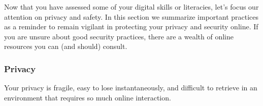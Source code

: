 \documentclass[
  letterpaper,
  DIV=11,
  numbers=noendperiod]{scrreprt}
\begin{document}
Now that you have assessed some of your digital skills or literacies,
let's focus our attention on privacy and safety. In this section we
summarize important practices as a reminder to remain vigilant in
protecting your privacy and security online. If you are unsure about
good security practices, there are a wealth of online resources you can
(and should) consult.

\subsubsection*{Privacy}\label{privacy}

Your privacy is fragile, easy to lose instantaneously, and difficult to
retrieve in an environment that requires so much online interaction.
\end{document}

